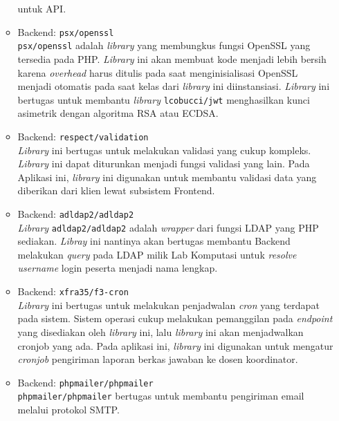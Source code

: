 \begin{itemize}
\begin{itemize}
                    untuk API.
                \item Backend: \texttt{psx/openssl} \\
                    \texttt{psx/openssl} adalah \textit{library} yang membungkus fungsi OpenSSL yang tersedia
                    pada PHP. \textit{Library} ini akan membuat kode menjadi lebih bersih karena \textit{overhead}
                    harus ditulis pada saat menginisialisasi OpenSSL menjadi otomatis pada saat kelas dari 
                    \textit{library} ini diinstansiasi.
                    \textit{Library} ini bertugas untuk membantu \textit{library} \texttt{lcobucci/jwt} menghasilkan kunci
                    asimetrik dengan algoritma RSA atau ECDSA. 
                \item Backend: \texttt{respect/validation} \\
                    \textit{Library} ini bertugas untuk melakukan validasi yang cukup kompleks. \textit{Library}
                    ini dapat diturunkan menjadi fungsi validasi yang lain. Pada Aplikasi ini, \textit{library} ini
                    digunakan untuk membantu validasi data yang diberikan dari klien lewat subsistem
                    Frontend.
                \item Backend: \texttt{adldap2/adldap2} \\
                    \textit{Library} \texttt{adldap2/adldap2} adalah \textit{wrapper} dari fungsi LDAP yang PHP sediakan.
                    \textit{Libray} ini nantinya akan bertugas membantu Backend melakukan \textit{query} 
                    pada LDAP milik Lab Komputasi untuk \textit{resolve} \textit{username} login peserta
                    menjadi nama lengkap.
                \item Backend: \texttt{xfra35/f3-cron} \\
                    \textit{Library} ini bertugas untuk melakukan penjadwalan \textit{cron} yang terdapat
                    pada sistem. Sistem operasi cukup melakukan pemanggilan pada \textit{endpoint} yang disediakan
                    oleh \textit{library} ini, lalu \textit{library} ini akan menjadwalkan cronjob yang ada.
                    Pada aplikasi ini, \textit{library} ini digunakan untuk mengatur \textit{cronjob} pengiriman
                    laporan berkas jawaban ke dosen koordinator.
                \item Backend: \texttt{phpmailer/phpmailer} \\
                    \texttt{phpmailer/phpmailer} bertugas untuk membantu pengiriman email melalui protokol SMTP.

\end{itemize}
\end{itemize}
